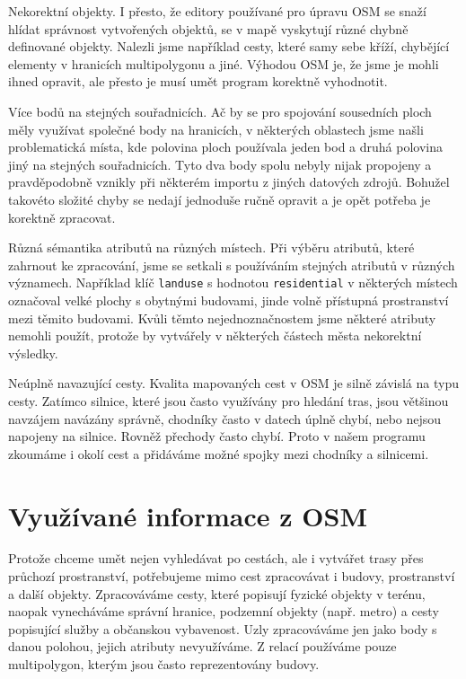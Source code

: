 {\tuc Nekorektní objekty.} I přesto, že editory používané pro úpravu OSM se snaží
hlídat správnost vytvořených objektů, se v mapě vyskytují různé chybně
definované objekty. Nalezli jsme například cesty, které samy sebe kříží,
chybějící elementy v hranicích multipolygonu a jiné. Výhodou OSM je, že jsme je
mohli ihned opravit, ale přesto je musí umět program korektně vyhodnotit.

{\tuc Více bodů na stejných souřadnicích.} Ač by se pro spojování sousedních ploch měly
využívat společné body na hranicích, v některých oblastech jsme našli
problematická místa, kde polovina ploch používala jeden bod a druhá polovina
jiný na stejných souřadnicích. Tyto dva body spolu nebyly nijak propojeny a
pravděpodobně vznikly při některém importu z jiných datových zdrojů. Bohužel
takovéto složité chyby se nedají jednoduše ručně opravit a je opět potřeba je
korektně zpracovat.

{\tuc Různá sémantika atributů na různých místech.} Při výběru atributů, které zahrnout
ke zpracování, jsme se setkali s používáním stejných atributů v různých
významech. Například klíč \verb|landuse| s hodnotou \verb|residential| v
některých místech označoval velké plochy s obytnými budovami, jinde volně
přístupná prostranství mezi těmito budovami. Kvůli těmto nejednoznačnostem jsme
některé atributy nemohli použít, protože by vytvářely v některých částech města
nekorektní výsledky.

{\tuc Neúplně navazující cesty.} Kvalita mapovaných cest v OSM je silně závislá na typu
cesty. Zatímco silnice, které jsou často využívány pro hledání tras, jsou
většinou navzájem navázány správně, chodníky často v datech úplně chybí, nebo
nejsou napojeny na silnice. Rovněž přechody často chybí. Proto v našem programu
zkoumáme i okolí cest a přidáváme možné spojky mezi chodníky a silnicemi.

\section{Využívané informace z OSM}
Protože chceme umět nejen vyhledávat po cestách, ale i vytvářet trasy přes
průchozí prostranství, potřebujeme mimo cest zpracovávat i budovy, prostranství 
a další objekty. Zpracováváme cesty, které popisují fyzické objekty v terénu,
naopak vynecháváme správní hranice, podzemní objekty (např. metro) a cesty
popisující služby a občanskou vybavenost. Uzly zpracováváme jen jako body s
danou polohou, jejich atributy nevyužíváme. Z relací používáme pouze
multipolygon, kterým jsou často reprezentovány budovy.

